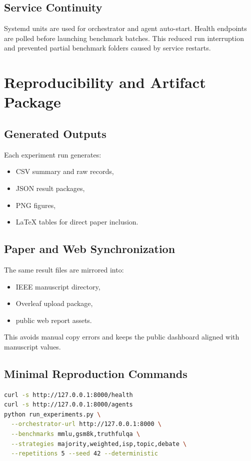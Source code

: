 \documentclass[conference]{IEEEtran}
\begin{document}
\subsection{Service Continuity}
Systemd units are used for orchestrator and agent auto-start. Health endpoints are polled before launching benchmark batches. This reduced run interruption and prevented partial benchmark folders caused by service restarts.

\section{Reproducibility and Artifact Package}
\subsection{Generated Outputs}
Each experiment run generates:
\begin{itemize}
  \item CSV summary and raw records,
  \item JSON result packages,
  \item PNG figures,
  \item LaTeX tables for direct paper inclusion.
\end{itemize}

\subsection{Paper and Web Synchronization}
The same result files are mirrored into:
\begin{itemize}
  \item IEEE manuscript directory,
  \item Overleaf upload package,
  \item public web report assets.
\end{itemize}

This avoids manual copy errors and keeps the public dashboard aligned with manuscript values.

\subsection{Minimal Reproduction Commands}
\begin{lstlisting}[language=bash,caption={Minimal run sequence for one benchmark pass.},label={lst:repro}]
curl -s http://127.0.0.1:8000/health
curl -s http://127.0.0.1:8000/agents
python run_experiments.py \
  --orchestrator-url http://127.0.0.1:8000 \
  --benchmarks mmlu,gsm8k,truthfulqa \
  --strategies majority,weighted,isp,topic,debate \
  --repetitions 5 --seed 42 --deterministic
\end{lstlisting}
\end{document}
